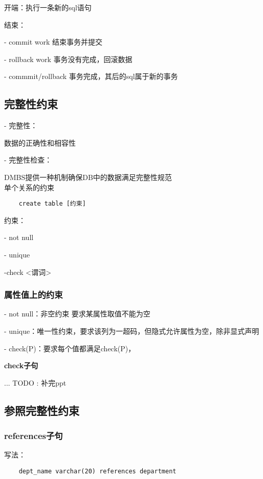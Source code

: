 \documentclass{article}        %
\begin{document}
开端：执行一条新的sql语句

结束：

- commit work 结束事务并提交 

- rollback work 事务没有完成，回滚数据

-  commmit/rollback 事务完成，其后的sql属于新的事务

\subsection{完整性约束}

- 完整性：

数据的正确性和相容性

- 完整性检查：

DMBS提供一种机制确保DB中的数据满足完整性规范\\

单个关系的约束 

\begin{verbatim}
    create table [约束]
\end{verbatim}

约束：

- not null 

- unique

-check <谓词> 

\subsubsection{属性值上的约束}

- not null：非空约束 要求某属性取值不能为空 

- unique：唯一性约束，要求该列为一超码，但隐式允许属性为空，除非显式声明

- check(P)：要求每个值都满足check(P)，

\textbf{check子句}

... TODO : 补完ppt

\subsection{参照完整性约束}

\subsubsection{references子句}

写法：

\begin{verbatim}
    dept_name varchar(20) references department 
\end{verbatim}
\end{document}
